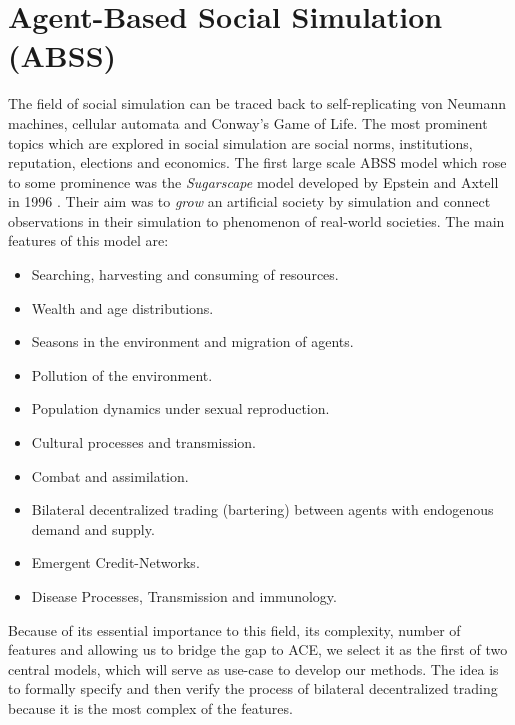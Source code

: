 \section{Agent-Based Social Simulation (ABSS)}
The field of social simulation can be traced back to self-replicating von Neumann machines, cellular automata and Conway's Game of Life. The most prominent topics which are explored in social simulation are social norms, institutions, reputation, elections and economics. The first large scale ABSS model which rose to some prominence was the \textit{Sugarscape} model developed by Epstein and Axtell in 1996 \cite{epstein_growing_1996}. Their aim was to \textit{grow} an artificial society by simulation and connect observations in their simulation to phenomenon of real-world societies. The main features of this model are:

\begin{itemize}
	\item Searching, harvesting and consuming of resources.
	\item Wealth and age distributions.
	\item Seasons in the environment and migration of agents.
	\item Pollution of the environment.
	\item Population dynamics under sexual reproduction.
	\item Cultural processes and transmission.
	\item Combat and assimilation.
	\item Bilateral decentralized trading (bartering) between agents with endogenous demand and supply.
	\item Emergent Credit-Networks.
	\item Disease Processes, Transmission and immunology.
\end{itemize}

Because of its essential importance to this field, its complexity, number of features and allowing us to bridge the gap to ACE, we select it as the first of two central models, which will serve as use-case to develop our methods. The idea is to formally specify and then verify the process of bilateral decentralized trading because it is the most complex of the features.

